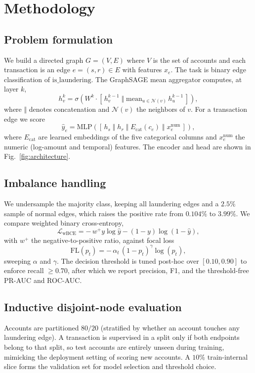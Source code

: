 \documentclass[conference]{IEEEtran}
\begin{document}
\section{Methodology}
\label{sec:method}
\subsection{Problem formulation}
We build a directed graph $G = (V, E)$ where $V$ is the set of accounts and each transaction is an edge
$e = (s, r) \in E$ with features $x_e$. The task is binary edge classification of $\text{is\_laundering}$.
The GraphSAGE mean aggregator computes, at layer $k$,
\begin{equation}
h_v^{k} = \sigma\!\left( W^{k} \cdot \left[\, h_v^{k-1} \;\Vert\; \mathrm{mean}_{u \in \mathcal{N}(v)}\, h_u^{k-1} \,\right] \right),
\end{equation}
where $\Vert$ denotes concatenation and $\mathcal{N}(v)$ the neighbors of $v$. For a transaction edge we
score
\begin{equation}
\hat{y}_e = \mathrm{MLP}\!\left( \left[\, h_s \;\Vert\; h_r \;\Vert\; E_{\mathrm{cat}}(c_e) \;\Vert\; x^{\mathrm{num}}_e \,\right] \right),
\end{equation}
where $E_{\mathrm{cat}}$ are learned embeddings of the five categorical columns and $x^{\mathrm{num}}_e$ the
numeric (log-amount and temporal) features. The encoder and head are shown in
Fig.~\ref{fig:architecture}.

\subsection{Imbalance handling}
We undersample the majority class, keeping all laundering edges and a $2.5\%$ sample of normal edges, which
raises the positive rate from $0.104\%$ to $3.99\%$. We compare weighted binary cross-entropy,
\begin{equation}
\mathcal{L}_{\mathrm{wBCE}} = -\, w^{+} y \log \hat{y} - (1-y)\log(1-\hat{y}),
\end{equation}
with $w^{+}$ the negative-to-positive ratio, against focal loss
\begin{equation}
\mathrm{FL}(p_t) = -\, \alpha_t\, (1 - p_t)^{\gamma} \log(p_t),
\end{equation}
sweeping $\alpha$ and $\gamma$. The decision threshold is tuned post-hoc over $[0.10, 0.90]$ to enforce
recall $\geq 0.70$, after which we report precision, F1, and the threshold-free PR-AUC and ROC-AUC.

\subsection{Inductive disjoint-node evaluation}
Accounts are partitioned $80/20$ (stratified by whether an account touches any laundering edge). A
transaction is supervised in a split only if both endpoints belong to that split, so test accounts are
entirely unseen during training, mimicking the deployment setting of scoring new accounts. A $10\%$
train-internal slice forms the validation set for model selection and threshold choice.
\end{document}
